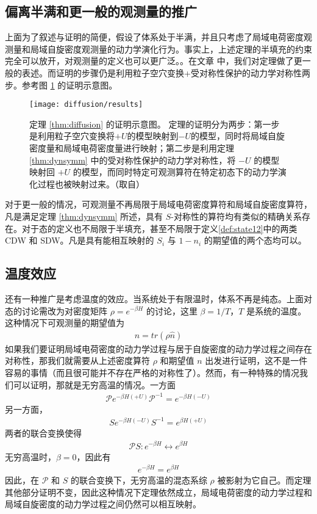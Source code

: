 \subsection{偏离半满和更一般的观测量的推广}
上面为了叙述与证明的简便，假设了体系处于半满，并且只考虑了局域电荷密度观测量和局域自旋密度观测量的动力学演化行为。事实上，上述定理的半填充的约束完全可以放开，对观测量的定义也可以更广泛。。在文章 中，我们对定理做了更一般的表述。而证明的步骤仍是利用粒子空穴变换+受对称性保护的动力学对称性两步。参考图 \ref{fig:diffusion:results} 的证明示意图。
\begin{figure}[!htb]
\centering
\texttt{[image: diffusion/results]}
\caption{定理 \ref{thm:diffusion} 的证明示意图。 定理的证明分为两步：第一步是利用粒子空穴变换将$+U$的模型映射到$-U$的模型，同时将局域自旋密度量和局域电荷密度量进行映射；第二步是利用定理 \ref{thm:dynsymm} 中的受对称性保护的动力学对称性，将 $-U$ 的模型映射回 $+U$ 的模型，而同时特定可观测算符在特定初态下的动力学演化过程也被映射过来。（取自）}
\label{fig:diffusion:results}
\end{figure}

对于更一般的情况，可观测量不再局限于局域电荷密度算符和局域自旋密度算符，凡是满足定理 \ref{thm:dynsymm} 所述，具有 $S$-对称性的算符均有类似的精确关系存在。对于态的定义也不局限于半填充，甚至不局限于定义\ref{def:state12}中的两类 CDW 和 SDW。凡是具有能相互映射的 $S_i$ 与 $1-n_i$ 的期望值的两个态均可以。


\subsection{温度效应}
还有一种推广是考虑温度的效应。当系统处于有限温时，体系不再是纯态。上面对态的讨论需改为对密度矩阵 $\rho=e^{-\beta H}$ 的讨论，这里 $\beta=1/T$，$T$ 是系统的温度。这种情况下可观测量的期望值为 
\begin{align}
n = tr(\rho\hat{n})
\end{align}
如果我们要证明局域电荷密度的动力学过程与居于自旋密度的动力学过程之间存在对称性，那我们就需要从上述密度算符 $\rho$ 和期望值 $n$ 出发进行证明，这不是一件容易的事情（而且很可能并不存在严格的对称性了）。然而，有一种特殊的情况我们可以证明，那就是无穷高温的情况。一方面
\begin{align}
\mathcal{P}e^{-\beta H(+U)}\mathcal{P}^{-1} = e^{-\beta H(-U)}
\end{align}
另一方面，
\begin{align}
Se^{-\beta H(-U)}S^{-1} = e^{\beta H(+U)}
\end{align}
两者的联合变换使得
\begin{align}
\mathcal{P}S: e^{-\beta H} \leftrightarrow e^{\beta H}
\end{align}
无穷高温时，$\beta=0$，因此有
\begin{align}
e^{-\beta H} = e^{\beta H}
\end{align}
因此，在 $\mathcal{P}$ 和 $S$ 的联合变换下，无穷高温的混态系综 $\rho$ 被影射为它自己。而定理其他部分证明不变，因此这种情况下定理依然成立，局域电荷密度的动力学过程和局域自旋密度的动力学过程之间仍然可以相互映射。



